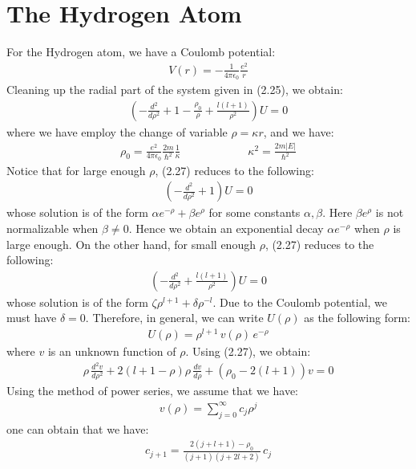\documentclass[11pt]{book}
\theoremstyle{break}
\theoremstyle{break}
\begin{document}
\section[The Hydrogen Atom]{\color{red}The Hydrogen Atom\color{black}}
For the Hydrogen atom, we have a Coulomb potential:
\begin{align*}
V(r) = -\frac{1}{4\pi \epsilon_0}\frac{e^2}{r}
\end{align*}
Cleaning up the radial part of the system given in (2.25), we obtain:
\begin{align}
\left( -\frac{d^2}{d\rho^2} +1 - \frac{\rho_0}{\rho} + \frac{l(l+1)}{\rho^2}\right) U = 0
\end{align}
where we have employ the change of variable $\rho = \kappa r$, and we have:
\begin{align*}
\rho_0 = \frac{e^2}{4\pi \epsilon_0} \frac{2m}{\hbar^2} \frac{1}{\kappa}\qquad\qquad\qquad \kappa^2 = \frac{2m|E|}{\hbar^2}
\end{align*}
Notice that for large enough $\rho$, (2.27) reduces to the following:
\begin{align*}
\left(-\frac{d^2}{d\rho^2} + 1 \right) U = 0
\end{align*}
whose solution is of the form $\alpha e^{-\rho}+ \beta e^{\rho}$ for some constants $\alpha,\beta$. Here $\beta e^{\rho}$ is not normalizable when $\beta \neq 0$. Hence we obtain an exponential decay $\alpha e^{-\rho}$ when $\rho$ is large enough. On the other hand, for small enough $\rho$, (2.27) reduces to the following:
\begin{align*}
\left( - \frac{d^2}{d\rho^2} + \frac{l(l+1)}{\rho^2}\right)U = 0
\end{align*} 
whose solution is of the form $\zeta \rho^{l+1} + \delta \rho^{-l}$. Due to the Coulomb potential, we must have $\delta = 0$. Therefore, in general, we can write $U(\rho)$ as the following form:
\begin{align}
U(\rho) = \rho^{l+1}\, v(\rho)\, e^{-\rho}
\end{align}
where $v$ is an unknown function of $\rho$. Using (2.27), we obtain:
\begin{align}
\rho\, \frac{d^2 v}{d\rho^2} + 2(l+1-\rho)\rho \, \frac{dv}{d\rho} + (\rho_0 -2(l+1)) v = 0
\end{align}
Using the method of power series, we assume that we have:
\begin{align*}
v(\rho) = \sum_{j=0}^\infty c_j \rho^j
\end{align*}
one can obtain that we have:
\begin{align}
c_{j+1} = \frac{2(j+l+1)-\rho_0}{(j+1)(j+2l+2)}\, c_j
\end{align}
\end{document}
